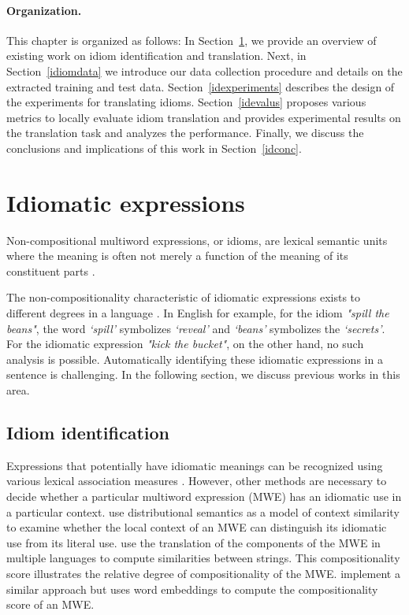  
\paragraph{Organization.} This chapter is organized as follows: 
In Section~\ref{idrel}, we provide an overview of existing work on idiom identification and translation. 
Next, in Section~\ref{idiomdata} we introduce our data collection procedure and details on the extracted training and test data. 
Section~\ref{idexperiments} describes the design of the experiments for translating idioms.
Section~\ref{idevalus} proposes various metrics to locally evaluate idiom translation and provides experimental results on the translation task and analyzes the performance. 
Finally, we discuss the conclusions and implications of this work in Section~\ref{idconc}. 



\section{Idiomatic expressions} \label{idrel}

Non-compositional multiword expressions, or idioms, are lexical semantic units where the meaning is often not merely a function of the meaning of its constituent parts \citep{10.2307/416483,doi:10.1093/applin/17.3.326}.

The non-compositionality characteristic of idiomatic expressions exists to different degrees in a language \citep{10.2307/416483}.
In English for example, for the idiom \textit{"spill the beans"}, the word \textit{`spill'} symbolizes \textit{`reveal'} and \textit{`beans'} symbolizes the \textit{`secrets'}. 
For the idiomatic expression \textit{"kick the bucket"}, on the other hand, no such analysis is possible.
Automatically identifying these idiomatic expressions in a sentence is challenging. 
In the following section, we discuss previous works in this area.

\subsection{Idiom identification} 

Expressions that potentially have idiomatic meanings can be recognized using various lexical association measures \citep{evert-krenn-2001-methods,evert-kermes-2003-experiments}.
However, other methods are necessary to decide whether a particular multiword expression (MWE) has an idiomatic use in a particular context.
\citet{katz-giesbrecht-2006-automatic} use distributional semantics as a model of context similarity to examine whether the local context of an MWE can distinguish its idiomatic use from its literal use.
\citet{salehi-cook-2013-predicting} use the translation of the components of the MWE in multiple languages to compute similarities between strings. This {compositionality score} illustrates the relative degree of compositionality of the MWE.
\citet{salehi-etal-2015-word} implement a similar approach but uses word embeddings to compute the compositionality score of an MWE.

